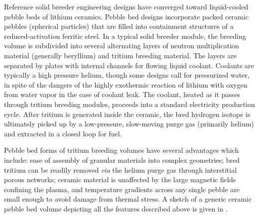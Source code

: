 Reference solid breeder engineering designs have converged toward liquid-cooled pebble beds of lithium ceramics.  Pebble bed designs incorporate packed ceramic pebbles (spherical particles) that are filled into containment structures of a reduced-activation ferritic steel. In a typical solid breeder module, the breeding volume is subdivided into several alternating layers of neutron multiplication material (generally beryllium) and tritium breeding material. The layers are separated by plates with internal channels for flowing liquid coolant. Coolants are typically a high pressure helium, though some designs call for pressurized water, in spite of the dangers of the highly exothermic reaction of lithium with oxygen from water vapor in the case of coolant leak. The coolant, heated as it passes through tritium breeding modules, proceeds into a standard electricity production cycle. After tritium is generated inside the ceramic, the bred hydrogen isotope is ultimately picked up by a low-pressure, slow-moving purge gas (primarily helium) and extracted in a closed loop for fuel. 

Pebble bed forms of tritium breeding volumes have several advantages which include: ease of assembly of granular materials into complex geometries; bred tritium can be readily removed \textit{via} the helium purge gas through interstitial porous networks; ceramic material is unaffected by the large magnetic fields confining the plasma, and temperature gradients across any single pebble are small enough to avoid damage from thermal stress. A sketch of a generic ceramic pebble bed volume depicting all the features described above is given in .\cite{Nomoto2006}

